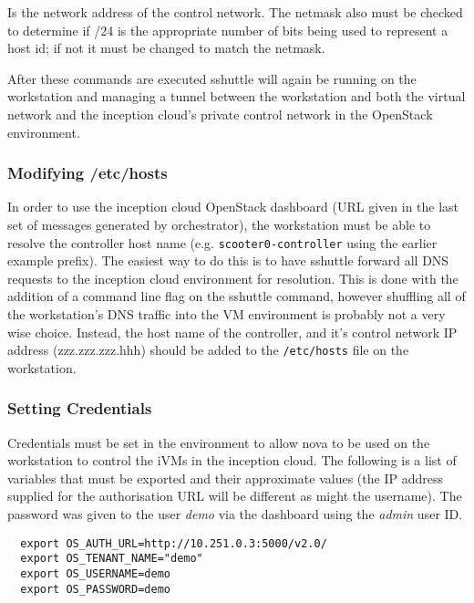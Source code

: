 \vspace{5pt}

\vspace{5pt}
 {
	Is the network address of the control network. The netmask also must be checked to determine if /24 is
	the appropriate number of bits being used to represent a host id; if not it must be changed to match the netmask.
}

\vspace{5pt}
\dlend

After these commands are executed sshuttle will again be running on the workstation and managing a tunnel between the
workstation and both the virtual network and the inception cloud's private control network in the OpenStack environment.

\subsubsection{Modifying /etc/hosts}
In order to use the inception cloud OpenStack dashboard (URL given in the last set of messages generated by orchestrator),
the workstation must be able to resolve the
controller host name (e.g. \verb!scooter0-controller! using the earlier example prefix).
The easiest way to do this is to have sshuttle forward all DNS requests to the inception cloud environment for resolution.
This is done with the addition of a command line flag on the sshuttle command, however shuffling all of the workstation's DNS
traffic into the VM environment is probably not a very wise choice.
Instead, the host name of the controller, and it's control network IP address (zzz.zzz.zzz.hhh) should be added to the
\verb!/etc/hosts! file on the workstation.


\subsubsection{Setting Credentials}
Credentials must be set in the environment to allow nova to be used on the workstation to control the iVMs in the
inception cloud.
The following is a list of variables that must be exported and their approximate values (the IP address supplied for the
authorisation URL will be different as might the username).
The password was given to the user \emph{demo} via the dashboard using the \emph{admin} user ID.

\small\begin{verbatim}
  export OS_AUTH_URL=http://10.251.0.3:5000/v2.0/
  export OS_TENANT_NAME="demo"
  export OS_USERNAME=demo
  export OS_PASSWORD=demo
\end{verbatim}\normalsize

